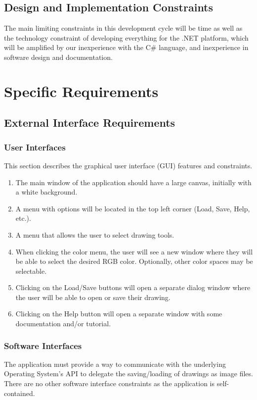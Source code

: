 \documentclass[12pt]{article}
\begin{document}
\subsection{Design and Implementation Constraints}
The main limiting constraints in this development cycle will be time as well as the technology constraint of developing everything for the .NET platform, which will be amplified by our inexperience with the C\# language, and inexperience in software design and documentation.

\section{Specific Requirements}
\subsection{External Interface Requirements}
\subsubsection{User Interfaces}
This section describes the graphical user interface (GUI) features and constraints.
\begin{enumerate}
\item The main window of the application should have a large canvas, initially with a white background.
\item A menu with options will be located in the top left corner (Load, Save, Help, etc.).
\item A menu that allows the user to select drawing tools.
\item When clicking the color menu, the user will see a new window where they will be able to select the desired RGB color. Optionally, other color spaces may be selectable.
\item Clicking on the Load/Save buttons will open a separate dialog window where the user will be able to open or save their drawing.
\item Clicking on the Help button will open a separate window with some documentation and/or tutorial.
\end{enumerate}

\subsubsection{Software Interfaces}
The application must provide a way to communicate with the underlying Operating System's API to delegate the saving/loading of drawings as image files. There are no other software interface constraints as the application is self-contained.
\end{document}
